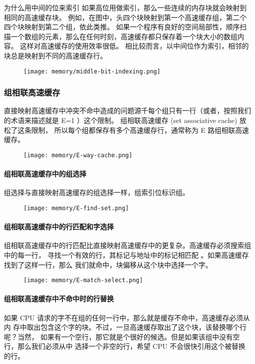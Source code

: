 \begin{sidenote}{为什么用中间的位来索引}
    如果高位用做索引，那么一些连续的内存块就会映射到相同的高速缓存块。
    例如，在图中，头四个块映射到第一个高速缓存组，第二个四个块映射到第二个组，依此类推。
    如果一个程序有良好的空间局部性，顺序扫描一个数组的元素，那么在任何时刻，高速缓存都只保存着一个块大小的数组内容。
    这样对高速缓存的使用效率很低。
    相比较而言，以中间位作为索引，相邻的块总是映射到不同的高速缓存行。
    \begin{figure}[H]
        \centering
        \texttt{[image: memory/middle-bit-indexing.png]}
    \end{figure}
\end{sidenote}

\subsubsection{组相联高速缓存}
直接映射高速缓存中冲突不命中造成的问题源千每个组只有一行（或者，按照我们的术语来描述就是 E=1 ）这个限制。
组相联高速缓存 (set associative cache) 放松了这条限制，
所以每个组都保存有多个高速缓存行，通常称为 E 路组相联高速缓存。
\begin{figure}[H]
    \centering
    \texttt{[image: memory/E-way-cache.png]}
\end{figure}

\paragraph{组相联高速缓存中的组选择}
组选择与直接映射高速缓存的组选择一样，组索引位标识组。
\begin{figure}[H]
    \centering
    \texttt{[image: memory/E-find-set.png]}
\end{figure}

\paragraph{组相联高速缓存中的行匹配和字选择}
组相联高速缓存中的行匹配比直接映射高速缓存中的更复杂。高速缓存必须搜索组中的每一行，
寻找一个有效的行，其标记与地址中的标记相匹配 。如果高速缓存找到了这样一行，那么
我们就命中，块偏移从这个块中选择一个字。
\begin{figure}[H]
    \centering
    \texttt{[image: memory/E-match-select.png]}
\end{figure}

\paragraph{组相联高速缓存中不命中时的行替换}
如果 CPU 请求的字不在组的任何一行中，那么就是缓存不命中，高速缓存必须从内
存中取出包含这个字的块。不过，一旦高速缓存取出了这个块，该替换哪个行呢？当然，
如果有一个空行，那它就是个很好的候选。但是如果该组中没有空行，那么我们必须从中
选择一个非空的行，希望 CPU 不会很快引用这个被替换的行。

